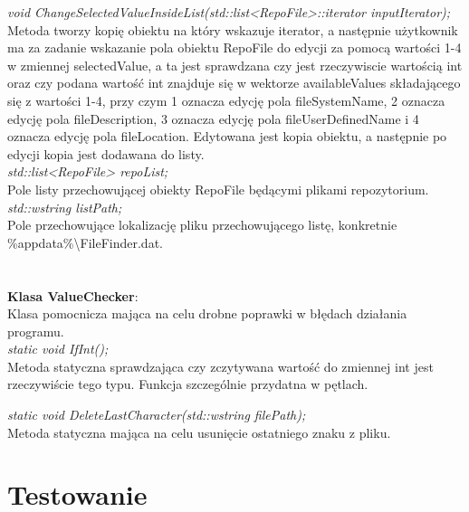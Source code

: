 \documentclass[10pt, a4paper]{article}
\begin{document}
\textit{void ChangeSelectedValueInsideList(std::list<RepoFile>::iterator inputIterator);}\\
Metoda tworzy kopię obiektu na który wskazuje iterator, a następnie użytkownik ma za zadanie wskazanie pola obiektu RepoFile do edycji za pomocą wartości 1-4 w  zmiennej selectedValue, a ta jest sprawdzana czy jest rzeczywiscie wartością int oraz czy podana wartość int znajduje się w wektorze availableValues składającego się z wartości 1-4, przy czym 1 oznacza edycję pola fileSystemName, 2 oznacza edycję pola fileDescription, 3 oznacza edycję pola fileUserDefinedName i 4 oznacza edycję pola fileLocation. Edytowana jest kopia obiektu, a następnie po edycji kopia jest dodawana do listy.\\

\textit{std::list<RepoFile> repoList;}\\
Pole listy przechowującej obiekty RepoFile będącymi plikami repozytorium.\\

\textit{std::wstring listPath;}\\
Pole przechowujące lokalizację pliku przechowującego listę, konkretnie \%appdata\%\textbackslash FileFinder.dat.\\

\\\\
\textbf{Klasa ValueChecker}:\\
Klasa pomocnicza mająca na celu drobne poprawki w błędach działania programu.\\

\textit{static void IfInt();}\\
Metoda statyczna sprawdzająca czy zczytywana wartość do zmiennej int jest rzeczywiście tego typu. Funkcja szczególnie przydatna w pętlach.

\textit{static void DeleteLastCharacter(std::wstring filePath);}\\
Metoda statyczna mająca na celu usunięcie ostatniego znaku z pliku.


\section{Testowanie}
\end{document}
